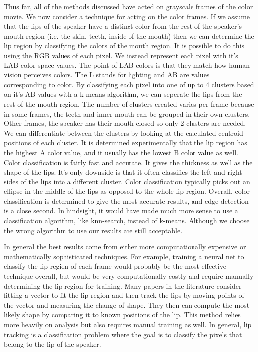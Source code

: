 \documentclass{article}
\begin{document}
 Thus far, all of the methods discussed have acted on grayscale frames of the color movie. We now consider a technique for acting on the color frames. If we assume that the lips of the speaker have a distinct color from the rest of the speaker's mouth region (i.e. the skin, teeth, inside of the mouth) then we can determine the lip region by classifying the colors of the mouth region. It is possible to do this using the RGB values of each pixel. We instead represent each pixel with it's LAB color space values. The point of LAB colors  is that they match how human vision perceives colors. The L stands for lighting and AB are values corresponding to color. By classifying each pixel into one of up to 4 clusters based on it's AB values with a k-means algorithm, we can seperate the lips from the rest of the mouth region. The number of clusters created varies per frame because in some frames, the teeth and inner mouth can be grouped in their own clusters. Other frames, the speaker has their mouth closed so only 2 clusters are needed. We can differentiate between the clusters by looking at the calculated centroid positions of each cluster. It is determined experimentally that the lip region has the highest A color value, and it usually has the lowest B color value as well.  Color classification is fairly fast and accurate. It gives the thickness as well as the shape of the lips. It's only downside is that it often classifies the left and right sides of the lips into a different cluster. Color classification typically picks out an ellipse in the middle of the lips as opposed to the whole lip region. Overall, color classification is determined to give the most accurate results, and edge detection is a close second. In hindsight, it would have made much more sense to use a classification algorithm, like knn-search, instead of k-means. Although we choose the wrong algorithm to use our results are still acceptable. \par
 In general the best results come from either more computationally expensive or mathematically sophisticated techniques. For example, training a neural net to classify the lip region of each frame would probably be the most effective technique overall, but would be very computationally costly and require manually determining the lip region for training. Many papers in the literature consider fitting a vector to fit the lip region and then track the lips by moving points of the vector and measuring the change of shape. They then can compute the most likely shape by comparing it to known positions of the lip. This method relies more heavily on analysis but also requires manual training as well. In general, lip tracking is a classification problem where the goal is to classify the pixels that belong to the lip of the speaker. 
\end{document}
